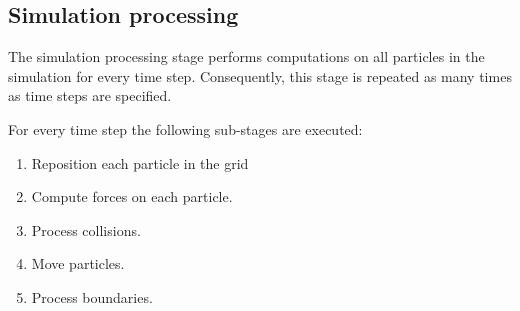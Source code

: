 \subsection{Simulation processing}

The simulation processing stage performs computations on all particles in the
simulation for every time step. Consequently, this stage is repeated as many
times as time steps are specified.

For every time step the following sub-stages are executed:

\begin{enumerate}

\item Reposition each particle in the grid
\item Compute forces on each particle.
\item Process collisions.
\item Move particles.
\item Process boundaries.

\end{enumerate}






